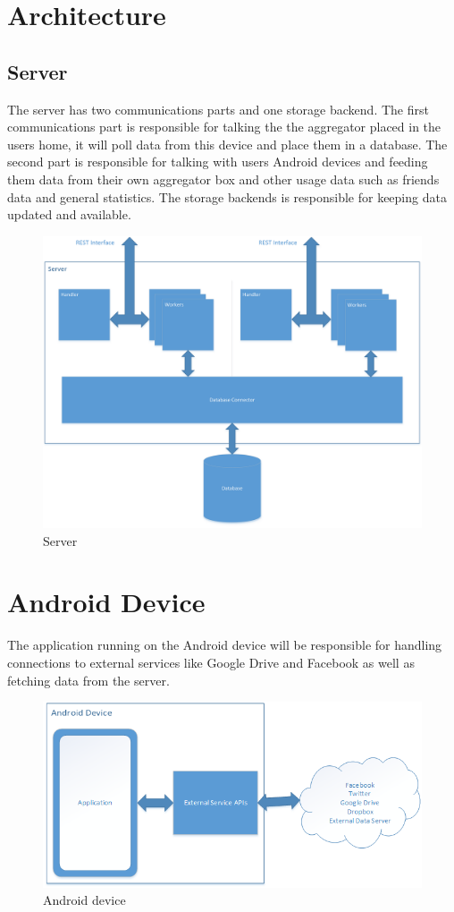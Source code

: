 \section{Architecture}
\subsection{Server}
The server has two communications parts and one storage backend. The first communications part is responsible for talking the the aggregator placed in the users home, it will poll data from this device and place them in a database. The second part is responsible for talking with users Android devices and feeding them data from their own aggregator box and other usage data such as friends data and general statistics. The storage backends is responsible for keeping data updated and available.

\begin{figure}[H]
\includegraphics[width=\textwidth]{ch/projectPlan/fig/server.png}
\caption{Server}
\end{figure}

\section{Android Device}
The application running on the Android device will be responsible for handling connections to external services like Google Drive and Facebook as well as fetching data from the server.

\begin{figure}[H]
\includegraphics[width=\textwidth]{ch/projectPlan/fig/androidDevice.png}
\caption{Android device}
\end{figure}

